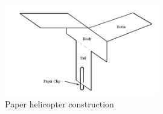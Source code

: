 \begin{figure}[h!]
\begin{center}
\includegraphics[width=0.6\textwidth]{./img/helicopter-2.png}
\caption{Paper helicopter construction}
\label{fig:helicopter-2}
\end{center}
\end{figure}
